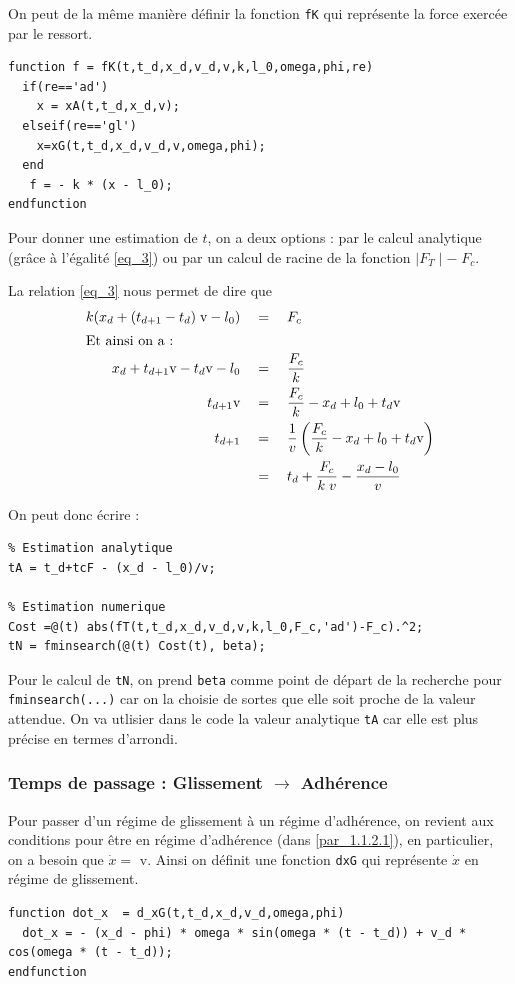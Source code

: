 \documentclass{article}
\newcommand{\ts}{\scriptscriptstyle}
\begin{document}
On peut de la même manière définir la fonction \verb|fK| qui représente la force exercée par le ressort.
\begin{lstlisting}
function f = fK(t,t_d,x_d,v_d,v,k,l_0,omega,phi,re)
  if(re=='ad')
    x = xA(t,t_d,x_d,v);
  elseif(re=='gl')
    x=xG(t,t_d,x_d,v_d,v,omega,phi);
  end
   f = - k * (x - l_0);
endfunction
\end{lstlisting}

Pour donner une estimation de $t$, on a deux options : par le calcul analytique (grâce à l'égalité \eqref{eq_3}) ou par un calcul de racine de la fonction $\mid F_{\ts T}\mid -\; F_c$.

La relation \eqref{eq_3} nous permet de dire que 
\begin{align}
k(x_d+(t_{d+1}-t_d)\;\text{v}-l_0) \quad &= \quad F_c \nonumber\\
\intertext{Et ainsi on a :}
x_d+t_{d+1}\text{v}-t_d\text{v}-l_0 \quad &= \quad \dfrac{F_c}{k}\nonumber\\
t_{d+1}\text{v}\quad &= \quad \dfrac{F_c}{k}-x_d+l_0+t_d\text{v}\nonumber\\
t_{d+1}\quad &=\quad \dfrac{1}{v}\left(\dfrac{F_c}{k}-x_d+l_0+t_d\text{v}\right)\nonumber\\
&=\quad t_d + \dfrac{F_c}{k\;v} - \dfrac{x_d - l_0}{v}
\end{align}

On peut donc écrire :
\begin{lstlisting}
% Estimation analytique
tA = t_d+tcF - (x_d - l_0)/v;

% Estimation numerique
Cost =@(t) abs(fT(t,t_d,x_d,v_d,v,k,l_0,F_c,'ad')-F_c).^2;
tN = fminsearch(@(t) Cost(t), beta);
\end{lstlisting}

Pour le calcul de \verb|tN|, on prend \verb|beta| comme point de départ de la recherche pour \verb|fminsearch(...)| car on la choisie de sortes que elle soit proche de la valeur attendue.
On va utlisier dans le code la valeur analytique \verb|tA| car elle est plus précise en termes d'arrondi.

\subsubsection{Temps de passage : Glissement $\rightarrow$ Adhérence}\label{sssec_2.2.2}
Pour passer d'un régime de glissement à un régime d'adhérence, on revient aux conditions pour être en régime d'adhérence (dans \ref{par_1.1.2.1}), en particulier, on a besoin que $\dot x = $ v.
Ainsi on définit une fonction \verb|dxG| qui représente $\dot x$ en régime de glissement.
\begin{lstlisting}
function dot_x  = d_xG(t,t_d,x_d,v_d,omega,phi)
  dot_x = - (x_d - phi) * omega * sin(omega * (t - t_d)) + v_d * cos(omega * (t - t_d));
endfunction
\end{lstlisting}
\end{document}
